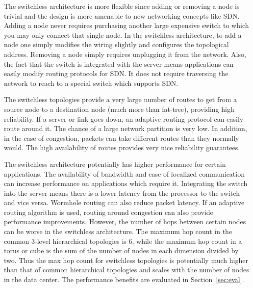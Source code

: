 The switchless architecture is more flexible since adding or removing a node is trivial and the design is more amenable to new networking concepts like SDN.  Adding a node never requires purchasing another large expensive switch to which you may only connect that single node.  In the switchless architecture, to add a node one simply modifies the wiring slightly and configures the topological address.  Removing a node simply requires unplugging it from the network.  Also, the fact that the switch is integrated with the server means applications can easily modify routing protocols for SDN.  It does not require traversing the network to reach to a special switch which supports SDN.

The switchless topologies provide a very large number of routes to get from a source node to a destination node (much more than fat-tree), providing high reliability.  If a server or link goes down, an adaptive routing protocol can easily route around it.  The chance of a large network partition is very low.  In addition, in the case of congestion, packets can take different routes than they normally would.  The high availability of routes provides very nice reliability guarantees.

The switchless architecture potentially has higher performance for certain applications.  The availability of bandwidth and ease of localized communication can increase performance on applications which require it.  Integrating the switch into the server means there is a lower latency from the processor to the switch and vice versa.  Wormhole routing can also reduce packet latency.  If an adaptive routing algorithm is used, routing around congestion can also provide performance improvements.  However, the number of hops between certain nodes can be worse in the switchless architecture.  The maximum hop count in the common 3-level hierarchical topologies is 6, while the maximum hop count in a torus or cube is the sum of the number of nodes in each dimension divided by two.  Thus the max hop count for switchless topologies is potentially much higher than that of common hierarchical topologies and scales with the number of nodes in the data center.  The performance benefits are evaluated in Section~\ref{sec:eval}.
